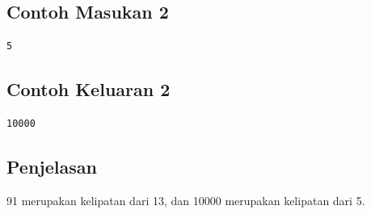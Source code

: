 \documentclass{article}
\begin{document}
\begin{multicols}{2}
\subsection*{Contoh Masukan 2}
\begin{lstlisting}
5
\end{lstlisting}
\columnbreak
\subsection*{Contoh Keluaran 2}
\begin{lstlisting}
10000
\end{lstlisting}
\vfill
\null
\end{multicols}

\subsection*{Penjelasan}
91 merupakan kelipatan dari 13, dan 10000 merupakan kelipatan dari 5.
\end{document}
